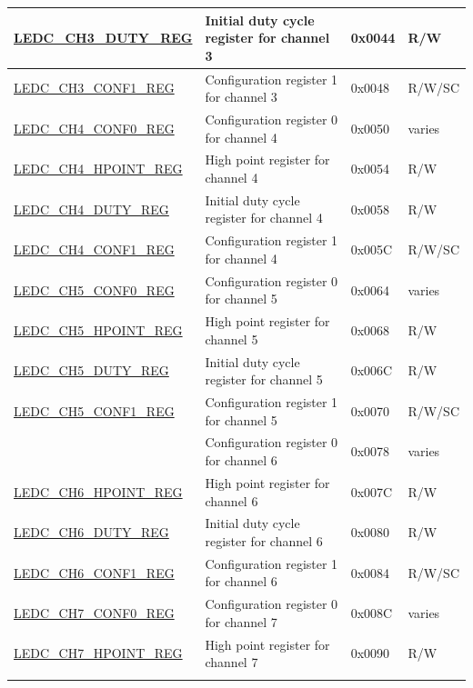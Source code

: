 \begin{longtable}{ | p{5.5cm} | p{6.8cm} | p{1.3cm} | p{2cm}| }
\hyperref[regdesc:LEDCCHNDUTYREG]{LEDC\_CH3\_DUTY\_REG} & Initial duty cycle register for channel 3 & 0x0044 & R/W \\ \hline
\hyperref[regdesc:LEDCCHNCONF1REG]{LEDC\_CH3\_CONF1\_REG} & Configuration register 1 for channel 3 & 0x0048 & R/W/SC \\ \hline
\hyperref[regdesc:LEDCCHNCONF0REG]{LEDC\_CH4\_CONF0\_REG} & Configuration register 0 for channel 4 & 0x0050 & varies \\ \hline
\hyperref[regdesc:LEDCCHNHPOINTREG]{LEDC\_CH4\_HPOINT\_REG} & High point register for channel 4 & 0x0054 & R/W \\ \hline
\hyperref[regdesc:LEDCCHNDUTYREG]{LEDC\_CH4\_DUTY\_REG} & Initial duty cycle register for channel 4 & 0x0058 & R/W \\ \hline
\hyperref[regdesc:LEDCCHNCONF1REG]{LEDC\_CH4\_CONF1\_REG} & Configuration register 1 for channel 4 & 0x005C & R/W/SC \\ \hline
\hyperref[regdesc:LEDCCHNCONF0REG]{LEDC\_CH5\_CONF0\_REG} & Configuration register 0 for channel 5 & 0x0064 & varies \\ \hline
\hyperref[regdesc:LEDCCHNHPOINTREG]{LEDC\_CH5\_HPOINT\_REG} & High point register for channel 5 & 0x0068 & R/W \\ \hline
\hyperref[regdesc:LEDCCHNDUTYREG]{LEDC\_CH5\_DUTY\_REG} & Initial duty cycle register for channel 5 & 0x006C & R/W \\ \hline
\hyperref[regdesc:LEDCCHNCONF1REG]{LEDC\_CH5\_CONF1\_REG} & Configuration register 1 for channel 5 & 0x0070 & R/W/SC \\ \hline
\tagged{ESP32-P4}{
    \hyperref[regdesc:LEDCCHNCONF0REG]{LEDC\_CH6\_CONF0\_REG} & Configuration register 0 for channel 6 & 0x0078 & varies \\ \hline
    \hyperref[regdesc:LEDCCHNHPOINTREG]{LEDC\_CH6\_HPOINT\_REG} & High point register for channel 6 & 0x007C & R/W \\ \hline
    \hyperref[regdesc:LEDCCHNDUTYREG]{LEDC\_CH6\_DUTY\_REG} & Initial duty cycle register for channel 6 & 0x0080 & R/W \\ \hline
    \hyperref[regdesc:LEDCCHNCONF1REG]{LEDC\_CH6\_CONF1\_REG} & Configuration register 1 for channel 6 & 0x0084 & R/W/SC \\ \hline
    \hyperref[regdesc:LEDCCHNCONF0REG]{LEDC\_CH7\_CONF0\_REG} & Configuration register 0 for channel 7 & 0x008C & varies \\ \hline
    \hyperref[regdesc:LEDCCHNHPOINTREG]{LEDC\_CH7\_HPOINT\_REG} & High point register for channel 7 & 0x0090 & R/W \\ \hline
}
\end{longtable}
